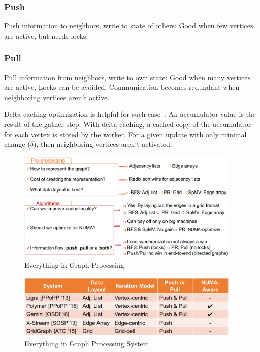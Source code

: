 \documentclass[UTF8,12pt,a4paper]{article}
\begin{document}
\subsubsection{Push}
Push information to neighbors, write to state of others:
Good when few vertices are active, but needs locks.
\subsubsection{Pull}
Pull information from neighbors, write to own state:
Good when many vertices are active, Locks can be avoided.
Communication becomes redundant when neighboring vertices aren't active.

Delta-caching optimization is helpful for such case~\cite{DBLP:conf/osdi/GonzalezLGBG12}.
An accumulator value is the result of the gather step.
With delta-caching, a cached copy of the accumulator for each vertex is stored by the worker.
For a given update with only minimal change ($\delta$),
then neighboring vertices aren’t activated.

\begin{figure}
  \begin{small}
    \begin{center}
      \includegraphics[width=0.95\textwidth]{figures/graph_atc17_everythinggraph1}
    \end{center}
    \caption{Everything in Graph Processing~\cite{DBLP:conf/usenix/MalicevicLZ17}}
    \label{fig:everythinggraph1}
  \end{small}
\end{figure}
\begin{figure}
  \begin{small}
    \begin{center}
      \includegraphics[width=0.95\textwidth]{figures/graph_atc17_everythinggraph2}
    \end{center}
    \caption{Everything in Graph Processing System~\cite{DBLP:conf/usenix/MalicevicLZ17}}
    \label{fig:everythinggraph2}
  \end{small}
\end{figure}
\end{document}
